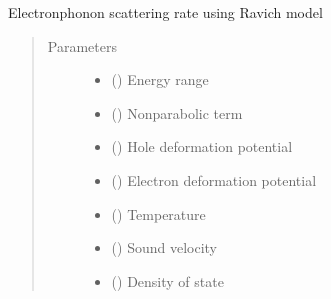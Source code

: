 \documentclass[letterpaper,10pt,english]{sphinxmanual}
\begin{document}
\begin{fulllineitems}
\label{\detokenize{autosummary/ThermoElectric.tau_p:ThermoElectric.tau_p}}
\sphinxAtStartPar
Electron\sphinxhyphen{}phonon scattering rate using Ravich model
\begin{quote}\begin{description}
\item[{Parameters}] \leavevmode\begin{itemize}
\item {} 
\sphinxAtStartPar
{} () \textendash{} Energy range

\item {} 
\sphinxAtStartPar
{} () \textendash{} Non\sphinxhyphen{}parabolic term

\item {} 
\sphinxAtStartPar
{} () \textendash{} Hole deformation potential

\item {} 
\sphinxAtStartPar
{} () \textendash{} Electron deformation potential

\item {} 
\sphinxAtStartPar
{} () \textendash{} Temperature

\item {} 
\sphinxAtStartPar
{} () \textendash{} Sound velocity

\item {} 
\sphinxAtStartPar
{} () \textendash{} Density of state


\end{itemize}
\end{description}
\end{quote}
\end{fulllineitems}
\end{document}
